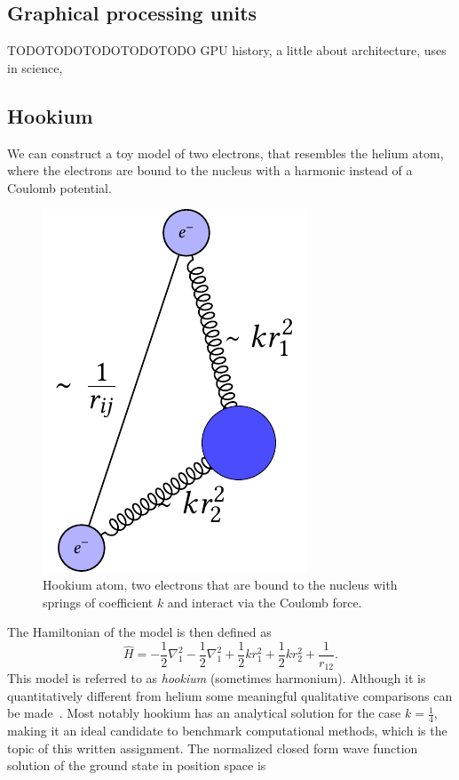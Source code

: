\documentclass[final,3p,times,twocolumn]{elsarticle}
\begin{document}
		
	\subsection{Graphical processing units}
		TODOTODOTODOTODOTODO
		GPU history,
		a little about architecture,
		uses in science, 
	
	\subsection{Hookium}
	We can construct a toy model of two electrons, that resembles the helium atom, where the electrons are bound to the nucleus with a harmonic instead of a Coulomb potential. 
	\begin{figure}[h]
		\centering
		\includegraphics[width=0.35\linewidth]{../diagrams/Hookium/hookium_diagram}
		\caption{Hookium atom, two electrons that are bound to the nucleus with springs of coefficient $k$ and interact via the Coulomb force.}
		\label{fig:hookiumdiagram}
	\end{figure}
	The Hamiltonian of the model is then defined as 
	\begin{equation}
		\hat{H}=-\frac{1}{2} \nabla_{1}^{2}-\frac{1}{2} \nabla_{1}^{2}+\frac{1}{2} k r_{1}^{2}+\frac{1}{2} k r_{2}^{2}+\frac{1}{r_{12}}.
	\end{equation}
	This model is referred to as \emph{hookium} (sometimes harmonium). Although it is quantitatively different from helium some meaningful qualitative comparisons can be made~\cite{ONeill2003wave}. Most notably hookium has an analytical solution for the case $k=\frac{1}{4}$, making it an ideal candidate to benchmark computational methods, which is the topic of this written assignment. The normalized closed form wave function solution of the ground state in position space is
\end{document}
